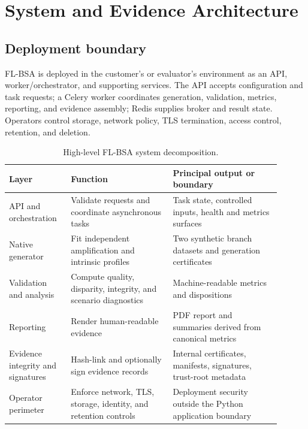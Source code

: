\section{System and Evidence Architecture}

\subsection{Deployment boundary}

FL-BSA is deployed in the customer's or evaluator's environment as an API, worker/orchestrator, and
supporting services. The API accepts configuration and task requests; a Celery worker coordinates
generation, validation, metrics, reporting, and evidence assembly; Redis supplies broker and result
state. Operators control storage, network policy, TLS termination, access control, retention, and
deletion.

\begin{table}[htbp]
\centering
\small
\AccessibleTableHeaderRow
\begin{tabular}{@{}>{\RaggedRight\arraybackslash}p{0.20\linewidth}
                    >{\RaggedRight\arraybackslash}p{0.34\linewidth}
                    >{\RaggedRight\arraybackslash}p{0.36\linewidth}@{}}
\toprule
Layer & Function & Principal output or boundary \\
\midrule
API and orchestration & Validate requests and coordinate asynchronous tasks & Task state, controlled inputs, health and metrics surfaces \\
Native generator & Fit independent amplification and intrinsic profiles & Two synthetic branch datasets and generation certificates \\
Validation and analysis & Compute quality, disparity, integrity, and scenario diagnostics & Machine-readable metrics and dispositions \\
Reporting & Render human-readable evidence & PDF report and summaries derived from canonical metrics \\
Evidence integrity and signatures & Hash-link and optionally sign evidence records & Internal certificates, manifests, signatures, trust-root metadata \\
Operator perimeter & Enforce network, TLS, storage, identity, and retention controls & Deployment security outside the Python application boundary \\
\bottomrule
\end{tabular}
\caption{High-level FL-BSA system decomposition.}
\label{tab:system-architecture}
\end{table}

